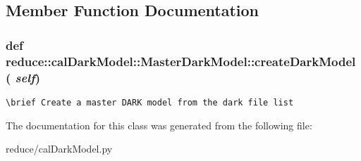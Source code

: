 \subsection{Member Function Documentation}
\subsubsection{\setlength{\rightskip}{0pt plus 5cm}def reduce::cal\-Dark\-Model::Master\-Dark\-Model::create\-Dark\-Model ( {\em self})}\label{classreduce_1_1calDarkModel_1_1MasterDarkModel_5a2ceae6f7aca46c1a7eac48eab2ccea}




\footnotesize\begin{verbatim}
\brief Create a master DARK model from the dark file list
\end{verbatim}
\normalsize
 

The documentation for this class was generated from the following file:\begin{CompactItemize}
\item 
reduce/cal\-Dark\-Model.py\end{CompactItemize}
